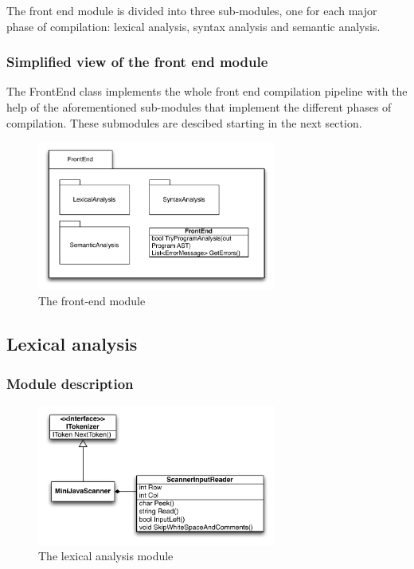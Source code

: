 \documentclass[a4paper,11pt]{article}
\begin{document}
The front end module is divided into three sub-modules, one for each major phase of compilation: lexical analysis, syntax analysis and semantic analysis.

\subsubsection{Simplified view of the front end module}

The FrontEnd class implements the whole front end compilation pipeline with the help of the aforementioned sub-modules that implement the different phases of compilation. These submodules are descibed starting in the next section.

\begin{figure}[h!]
\centering
\includegraphics[width=0.7\textwidth]{frontend.pdf}
\caption{The front-end module}
\end{figure}


\subsection{Lexical analysis}

\subsubsection{Module description}

\begin{figure}[h!]
\centering
\includegraphics[width=0.7\textwidth]{lexical_analysis.pdf}
\caption{The lexical analysis module}
\end{figure}
\end{document}
